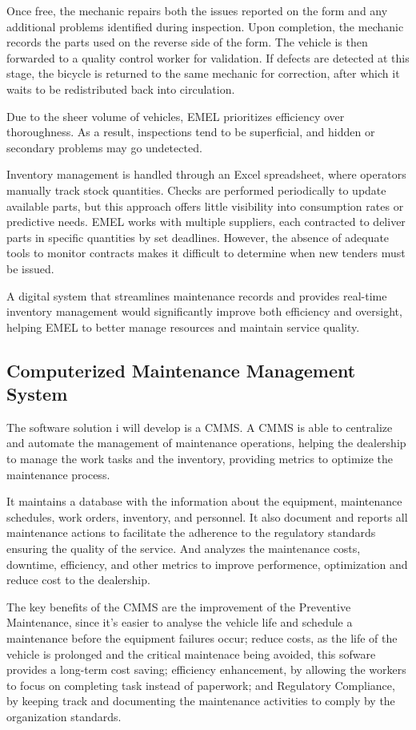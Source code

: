Once free, the mechanic repairs both the issues reported on the form and any additional problems identified during inspection. Upon completion, the mechanic records the parts used on the reverse side of the form. The vehicle is then forwarded to a quality control worker for validation. If defects are detected at this stage, the bicycle is returned to the same mechanic for correction, after which it waits to be redistributed back into circulation.

Due to the sheer volume of vehicles, EMEL prioritizes efficiency over thoroughness. As a result, inspections tend to be superficial, and hidden or secondary problems may go undetected.

Inventory management is handled through an Excel spreadsheet, where operators manually track stock quantities. Checks are performed periodically to update available parts, but this approach offers little visibility into consumption rates or predictive needs. EMEL works with multiple suppliers, each contracted to deliver parts in specific quantities by set deadlines. However, the absence of adequate tools to monitor contracts makes it difficult to determine when new tenders must be issued.

A digital system that streamlines maintenance records and provides real-time inventory management would significantly improve both efficiency and oversight, helping EMEL to better manage resources and maintain service quality.


\subsection{Computerized Maintenance Management System}

The software solution i will develop is a \ac{CMMS}.
A \ac{CMMS} is able to centralize and automate the management of maintenance operations, helping the dealership to manage the work tasks and the inventory, providing metrics to optimize the maintenance process.

It maintains a database with the information about the equipment, maintenance schedules, work orders, inventory, and personnel. 
It also document and reports all maintenance actions to facilitate the adherence to the regulatory standards ensuring the quality of the service. 
And analyzes the maintenance costs, downtime, efficiency, and other metrics to improve performence, optimization and reduce cost to the dealership.

The key benefits of the \ac{CMMS} are the improvement of the Preventive Maintenance, since it's easier to analyse the vehicle life and schedule a maintenance before the equipment failures occur; reduce costs, as the life of the vehicle is prolonged and the critical maintenace being avoided, this sofware provides a long-term cost saving; efficiency enhancement, by allowing the workers to focus on completing task instead of paperwork; and Regulatory Compliance, by keeping track and documenting the maintenance activities to comply by the organization standards. 


